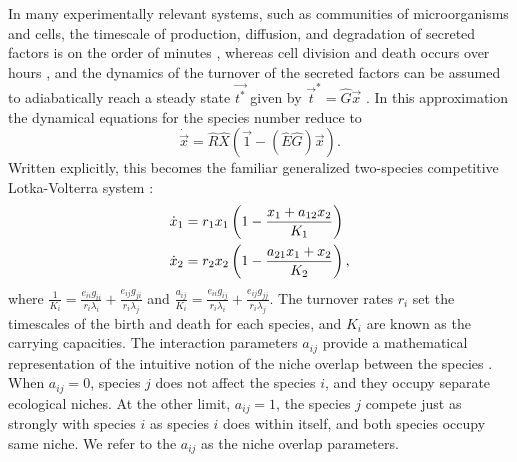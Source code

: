 In many experimentally relevant systems, such as communities of microorganisms and cells, the timescale of production, diffusion, and degradation of secreted factors is on the order of minutes \cite{Belle2006}, whereas cell division and death occurs over hours \cite{Powell1956,Lenski1991}, and the dynamics of the turnover of the secreted factors can be assumed to adiabatically reach a steady state $\vec{t^*}$ given by $\vec{t}^* = \hat{G} \vec{x}$ \cite{Posfai2017,Assaf2016,Chotibut2017a}. %
In this approximation the dynamical equations for the species number reduce to
\begin{equation}
\dot{\vec{x}} = \hat{R}\hat{X} \left( \vec{1} - (\hat{E}\hat{G})\vec{x} \right).
\end{equation}\label{eq-xdot-adiabatic}
Written explicitly, this becomes the familiar generalized two-species competitive Lotka-Volterra system \cite{Chotibut2015,MacArthur1970,Dobrinevski2012,Constable2015,Bomze1983,Levin1970,Czuppon2017,Young2018}:
\begin{align}
\dot{x}_1 &= r_1 x_1 \left( 1 - \frac{x_1 + a_{12} x_2}{K_1} \right) \notag \\
\dot{x}_2 &= r_2 x_2 \left( 1 - \frac{a_{21} x_1 + x_2}{K_2} \right), \label{mean-field-eqns}
\end{align}
where $\frac{1}{K_i} = \frac{e_{ii} g_{ii}}{r_i \lambda_i} + \frac{e_{ij} g_{ji}}{r_i \lambda_j}$ and $\frac{a_{ij}}{K_i} = \frac{e_{ii} g_{ij}}{r_i \lambda_i} + \frac{e_{ij} g_{jj}}{r_i \lambda_j}$. %
The turnover rates $r_i$ set the timescales of the birth and death for each species, and $K_i$ are known as the carrying capacities. The interaction parameters $a_{ij}$  provide a mathematical representation of the intuitive notion of the niche overlap between the species \cite{MacArthur1967,Abrams1980,Schoener1985,Chesson2008}. When $a_{ij}=0$, species $j$ does not affect the species $i$, and they occupy separate ecological niches. At the other limit, $a_{ij}=1$, the species $j$ compete just as strongly with species $i$ as species $i$ does within itself, and both species occupy same niche. We refer to the $a_{ij}$ as the niche overlap parameters.

